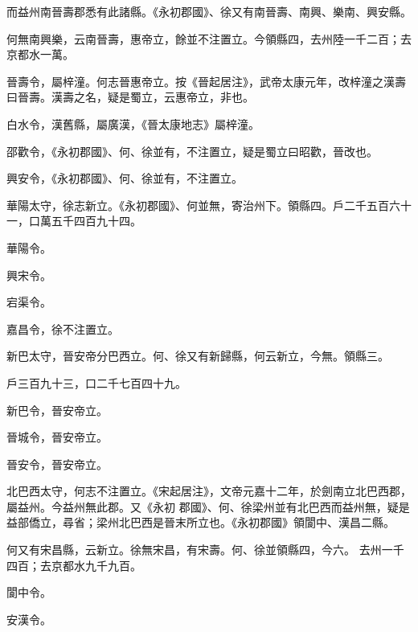 \begin{pinyinscope}
 而益州南晉壽郡悉有此諸縣。《永初郡國》、徐又有南晉壽、南興、樂南、興安縣。



 何無南興樂，云南晉壽，惠帝立，餘並不注置立。今領縣四，去州陸一千二百；去京都水一萬。



 晉壽令，屬梓潼。何志晉惠帝立。按《晉起居注》，武帝太康元年，改梓潼之漢壽曰晉壽。漢壽之名，疑是蜀立，云惠帝立，非也。



 白水令，漢舊縣，屬廣漢，《晉太康地志》屬梓潼。



 邵歡令，《永初郡國》、何、徐並有，不注置立，疑是蜀立曰昭歡，晉改也。



 興安令，《永初郡國》、何、徐並有，不注置立。



 華陽太守，徐志新立。《永初郡國》、何並無，寄治州下。領縣四。戶二千五百六十一，口萬五千四百九十四。



 華陽令。



 興宋令。



 宕渠令。



 嘉昌令，徐不注置立。



 新巴太守，晉安帝分巴西立。何、徐又有新歸縣，何云新立，今無。領縣三。



 戶三百九十三，口二千七百四十九。



 新巴令，晉安帝立。



 晉城令，晉安帝立。



 晉安令，晉安帝立。



 北巴西太守，何志不注置立。《宋起居注》，文帝元嘉十二年，於劍南立北巴西郡，屬益州。今益州無此郡。又《永初
 郡國》、何、徐梁州並有北巴西而益州無，疑是益部僑立，尋省；梁州北巴西是晉末所立也。《永初郡國》領閬中、漢昌二縣。


何又有宋昌縣，云新立。徐無宋昌，有宋壽。何、徐並領縣四，今六。
 去州一千四百；去京都水九千九百。


閬中令。


安漢令。



\end{pinyinscope}
